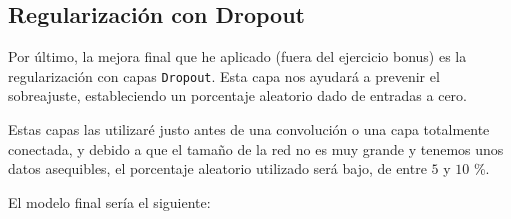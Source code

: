 \documentclass[12pt, spanish]{article}
\begin{document}
\subsection{Regularización con Dropout}

Por último, la mejora final que he aplicado (fuera del ejercicio bonus) es la regularización con capas \texttt{Dropout}\cite{dropout}. Esta capa nos ayudará a prevenir el sobreajuste, estableciendo un porcentaje aleatorio dado de entradas a cero.

Estas capas las utilizaré justo antes de una convolución o una capa totalmente conectada, y debido a que el tamaño de la red no es muy grande y tenemos unos datos asequibles, el porcentaje aleatorio utilizado será bajo, de entre $5$ y $10$ \%.

El modelo final sería el siguiente:
\end{document}
